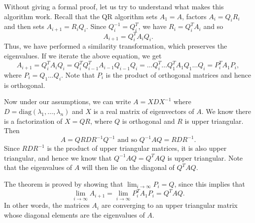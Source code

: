 \documentclass[journal]{IEEEtran}
\numberwithin{equation}{section}
\begin{document}
Without giving a formal proof, let us try to understand what makes this algorithm work. Recall that the QR algorithm sets \(A_1 = A\), factors \(A_i = Q_iR_i\) and then sets \(A_{i+1} = R_iQ_i\). Since \(Q_i^{-1} = Q_i^T\), we have \(R_i = Q_i^T A_i\) and so
$$
A_{i+1} = Q_i^T A_i Q_i.
$$
Thus, we have performed a similarity transformation, which preserves the eigenvalues. If we iterate the above equation, we get
$$
A_{i+1} = Q_i^T A_i Q_i = Q_i^T Q_{i-1}^T A_{i-1} Q_{i-1} Q_i = \dots Q_i^T \dots Q_1^T A_1 Q_1 \dots Q_i = P_i^T A_1 P_i,
$$
where \(P_i = Q_1 \dots Q_i\). Note that \(P_i\) is the product of orthogonal matrices and hence is orthogonal.

Now under our assumptions, we can write \(A = XDX^{-1}\) where \(D = \text{diag}(\lambda_1, \dots, \lambda_n)\) and \(X\) is a real matrix of eigenvectors of \(A\). We know there is a factorization of \(X = QR\), where \(Q\) is orthogonal and \(R\) is upper triangular. Then
$$
A = QRDR^{-1}Q^{-1} \text{ and so } Q^{-1}AQ = RDR^{-1}.
$$
Since \(RDR^{-1}\) is the product of upper triangular matrices, it is also upper triangular, and hence we know that \(Q^{-1}AQ = Q^T AQ\) is upper triangular. Note that the eigenvalues of \(A\) will then lie on the diagonal of \(Q^T AQ\).

The theorem is proved by showing that \(\lim_{i \to \infty} P_i = Q\), since this implies that
$$
\lim_{i \to \infty} A_{i+1} = \lim_{i \to \infty} P_i^T A_1 P_i = Q^T AQ.
$$
In other words, the matrices \(A_i\) are converging to an upper triangular matrix whose diagonal elements are the eigenvalues of \(A\).
\end{document}
